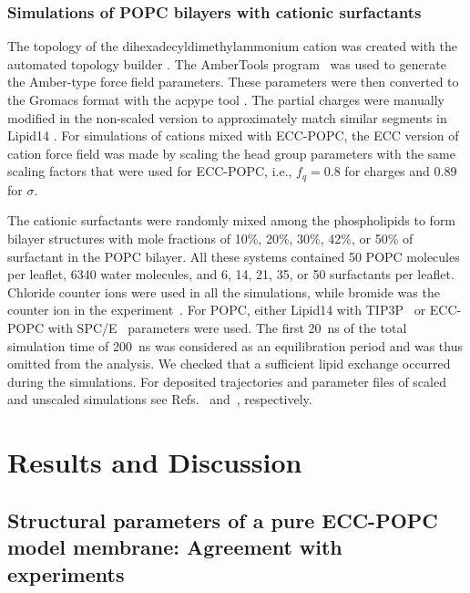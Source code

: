 \documentclass[journal=jpcbfk,manuscript=article]{achemso}
\begin{document}
\subsubsection{Simulations of POPC bilayers with cationic surfactants}
The topology of the dihexadecyldimethylammonium cation was created with the automated topology builder \cite{malde11}.
The AmberTools program~\cite{amber} was used to generate the Amber-type force field parameters. These parameters were
then converted to the Gromacs format with the acpype tool \cite{acpype}. The partial charges were manually modified in
the non-scaled version to approximately match similar segments in Lipid14 \cite{dickson14}.
For simulations of cations mixed with ECC-POPC, the ECC version of cation force field was made
by scaling the head group parameters with the same scaling factors that were
used for ECC-POPC, i.e., $f_q=0.8$ for charges and 0.89 for $\sigma$.

The cationic surfactants were randomly mixed among the phospholipids to form bilayer structures with mole fractions of 10\%, 20\%, 30\%, 42\%, or 50\% of surfactant in the POPC bilayer. All these systems contained 50 POPC molecules per leaflet, 6340 water molecules, and 6, 14, 21, 35, or 50 surfactants per leaflet.  Chloride counter ions were used in all the simulations, while bromide was the counter ion in the experiment~\cite{scherer89}. For POPC, either Lipid14 with TIP3P~\cite{jorgensen83} or ECC-POPC with SPC/E~\cite{Berendsen1987} parameters  were used. The first 20~ns of the total simulation time of 200~ns was considered as an equilibration period and was thus omitted from the analysis. We checked that a sufficient lipid  exchange occurred during the simulations.
For deposited trajectories and parameter files of scaled and unscaled simulations see
Refs.~ and~, respectively.

\section{Results and Discussion}

\subsection{Structural parameters of a pure ECC-POPC model membrane: Agreement with experiments}
\end{document}
